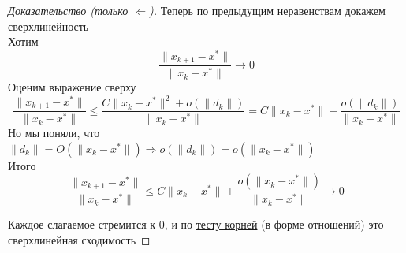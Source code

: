 \begin{proof}[Доказательство (только $\Leftarrow$)]
  Теперь по предыдущим неравенствам докажем \hyperref[note:9FA20DA5-3A95-4683-9CB5-C6C9A903C86A]{сверхлинейность} \\
  Хотим
  \[
  \frac{\|x_{k+1} - x^{*}\|}{\|x_k - x^{*}\|} \rightarrow 0
  \]
  Оценим выражение сверху
  \[
  \frac{\|x_{k+1} - x^{*}\|}{\|x_k - x^{*}\|} \le
  \frac{C\|x_k - x^{*}\|^2 + o(\|d_k\|)}{\|x_k - x^{*}\|}
  = C\|x_k - x^{*}\| + \frac{o(\|d_k\|)}{\|x_k - x^{*}\|}
  \]
  Но мы поняли, что $\|d_k\| = O(\|x_k - x^{*}\|) \Rightarrow o(\|d_k\|) = o(\|x_k - x^{*}\|)$ \\
  Итого
  \[
  \frac{\|x_{k+1} - x^{*}\|}{\|x_k - x^{*}\|} \le
   C\|x_k - x^{*}\| + \frac{o(\|x_k - x^{*}\|)}{\|x_k - x^{*}\|} \rightarrow 0
  \]

  Каждое слагаемое стремится к 0, и по \hyperref[note:C0408924-F658-43DF-8794-0C9AA85E7580]{тесту корней} (в форме отношений) это сверхлинейная сходимость
\end{proof}
